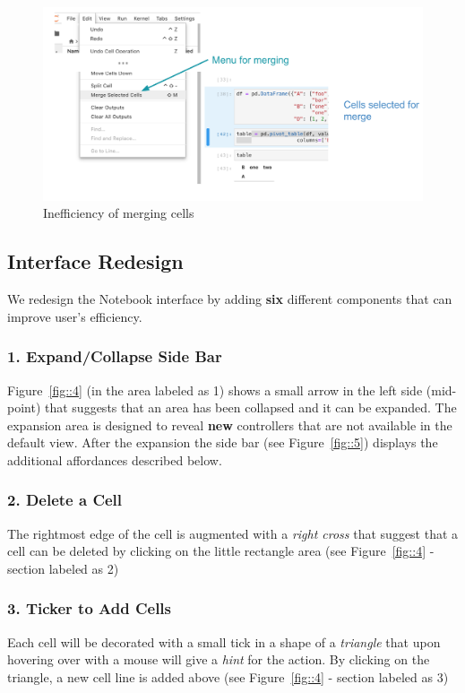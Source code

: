 \documentclass[12pt,letterpaper]{article}
\begin{document}
\begin{figure}[h]
\centering
\includegraphics[scale=.55]{figures/project-principles/cell_merge_eval.png}
\caption{Inefficiency of merging cells}
\label{fig::3}
\end{figure}


\subsection*{Interface Redesign}
We redesign the Notebook interface by adding \textbf{six} different components that can improve user's efficiency.

\subsubsection*{1. Expand/Collapse Side Bar}
Figure~\ref{fig::4} (in the area labeled as 1) shows a small arrow in the left side (mid-point) that suggests that an area has been collapsed and it can be expanded. The expansion area is designed to reveal \textbf{new} controllers that are not available in the default view. After the expansion the side bar (see Figure~\ref{fig::5}) displays the additional affordances described below.

\subsubsection*{2. Delete a Cell}
The rightmost edge of the cell is augmented with a \textit{right cross}  that suggest that a cell can be deleted by clicking on the little rectangle area (see Figure~\ref{fig::4} - section labeled as 2)

\subsubsection*{3. Ticker to Add Cells}
Each cell will be decorated with a small tick in a shape of a \textit{triangle} that upon hovering over with a mouse will give a \textit{hint} for the action. By clicking on the triangle, a new cell line is added above (see Figure~\ref{fig::4} - section labeled as 3)
\end{document}
